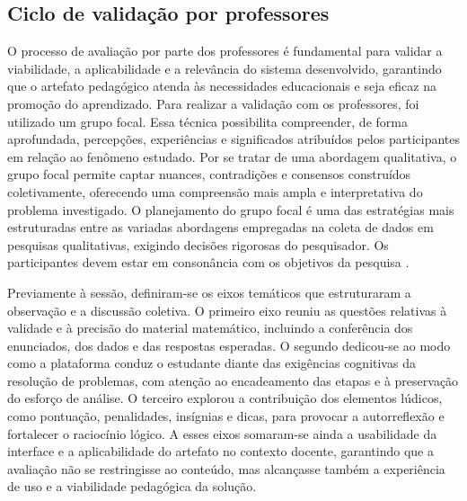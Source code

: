 \subsection{Ciclo de validação por professores}
O processo de avaliação por parte dos professores é fundamental para validar a
viabilidade, a aplicabilidade e a relevância do sistema desenvolvido, garantindo que o artefato
pedagógico atenda às necessidades educacionais e seja eficaz na promoção do aprendizado.
Para realizar a validação com os professores, foi utilizado um grupo focal. Essa
técnica possibilita compreender, de forma aprofundada, percepções, experiências e significados
atribuídos pelos participantes em relação ao fenômeno estudado. Por se tratar de uma abordagem
qualitativa, o grupo focal permite captar nuances, contradições e consensos construídos coletivamente, oferecendo uma compreensão mais ampla e interpretativa do problema investigado. O
planejamento do grupo focal é uma das estratégias mais estruturadas entre as variadas abordagens empregadas na coleta de dados em pesquisas qualitativas, exigindo decisões rigorosas do
pesquisador. Os participantes devem estar em consonância com os objetivos da pesquisa \cite{gil2021pesquisa}.

Previamente à sessão, definiram-se os eixos temáticos que estruturaram a observação e a discussão coletiva. O primeiro eixo reuniu as questões relativas à validade e à precisão do material matemático, incluindo a conferência dos enunciados, dos dados e das respostas esperadas. O segundo dedicou-se ao modo como a plataforma conduz o estudante diante das exigências cognitivas da resolução de problemas, com atenção ao encadeamento das etapas e à preservação do esforço de análise. O terceiro explorou a contribuição dos elementos lúdicos, como pontuação, penalidades, insígnias e dicas, para provocar a autorreflexão e fortalecer o raciocínio lógico. A esses eixos somaram-se ainda a usabilidade da interface e a aplicabilidade do artefato no contexto docente, garantindo que a avaliação não se restringisse ao conteúdo, mas alcançasse também a experiência de uso e a viabilidade pedagógica da solução.

